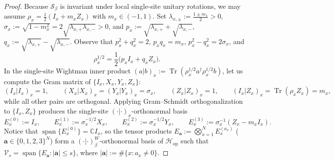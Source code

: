 \documentclass[11pt,a4paper]{article}
\numberwithin{equation}{section}
\theoremstyle{plain}
\theoremstyle{definition}
\newcommand{\Hop}{\mathcal{H}_{\mathrm{op}}}
\newcommand{\Tr}{\operatorname{Tr}}
\begin{document}
\begin{proof}
Because $\mathcal{S}_\beta$ is invariant under local single-site unitary rotations, we may assume $\rho_x = \frac{1}{2}(I_x + m_x Z_x)$ with $m_x\in(-1,1)$. Set $\lambda_{x,\pm} := \frac{1\pm m_x}{2} > 0$, $\sigma_x := \sqrt{1-m_x^2} = 2\sqrt{\lambda_{x,+}\lambda_{x,-}} > 0$, and $p_x := \sqrt{\lambda_{x,+}} + \sqrt{\lambda_{x,-}}$, $q_x := \sqrt{\lambda_{x,+}} - \sqrt{\lambda_{x,-}}$. Observe that $p_x^2 + q_x^2 = 2$, $p_x q_x = m_x$, $p_x^2 - q_x^2 = 2\sigma_x$, and
\[
  \rho_x^{1/2} = \frac{1}{2}\bigl(p_x I_x + q_x Z_x\bigr).
\]
In the single-site Wightman inner product $(a|b)_x := \Tr(\rho_x^{1/2}a^\dagger\rho_x^{1/2}b)$, let us compute the Gram matrix of $\{I_x, X_x, Y_x, Z_x\}$:
\[
  (I_x|I_x)_x = 1, \qquad
  (X_x|X_x)_x = (Y_x|Y_x)_x = \sigma_x, \qquad
  (Z_x|Z_x)_x = 1, \qquad
  (I_x|Z_x)_x = \Tr(\rho_x Z_x) = m_x,
\]
while all other pairs are orthogonal. Applying Gram--Schmidt orthogonalization to $\{I_x, Z_x\}$ produces the single-site $(\cdot|\cdot)_x$-orthonormal basis
\[
  E_x^{(0)} := I_x, \qquad
  E_x^{(1)} := \sigma_x^{-1/2} X_x, \qquad
  E_x^{(2)} := \sigma_x^{-1/2} Y_x, \qquad
  E_x^{(3)} := \sigma_x^{-1}(Z_x - m_x I_x).
\]
Notice that $\operatorname{span}\{E_x^{(0)}\} = \mathbb{C}I_x$, so the tensor products $E_{\mathbf{a}} := \bigotimes_{x=1}^N E_x^{(a_x)}$ ($\mathbf{a}\in\{0,1,2,3\}^N$) form a $(\cdot|\cdot)_\beta^W$-orthonormal basis of $\Hop$ such that $\mathcal{V}_s = \operatorname{span}\{E_{\mathbf{a}} : |\mathbf{a}|\le s\}$, where $|\mathbf{a}| := \#\{x : a_x \ne 0\}$.


\end{proof}
\end{document}
